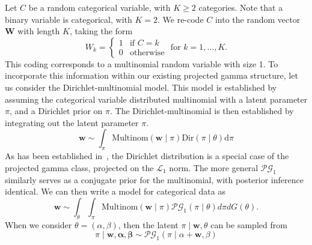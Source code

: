 Let $C$ be a random categorical variable, with $K \geq 2$ categories.  Note 
  that a binary variable is categorical, with $K = 2$. We re-code $C$ into the 
  random vector $\bm{W}$ with length $K$, taking the form
  \[
    W_k = \begin{cases}
    1 &\text{if }C = k\\
    0 &\text{otherwise}
    \end{cases} \text{ for }k = 1,\ldots, K.
  \]
  This coding corresponds to a multinomial random variable with size 1. To 
  incorporate this information within our existing projected gamma structure, 
  let us consider the Dirichlet-multinomial model.  This model is established by
  assuming the categorical variable distributed multinomial with a latent 
  parameter $\pi$, and a Dirichlet prior on $\pi$. The Dirichlet-multinomial is 
  then established by integrating out the latent parameter $\pi$. 
  \[
    \bm{w} \sim \int_{\pi} \text{Multinom}(\bm{w}\mid\pi)\text{Dir}(\pi\mid\theta)\text{d}\pi
  \]
  As has been established in~\cite{trubey:pg}, the Dirichlet distribution is a 
  special case of the projected gamma class, projected on the $\mathcal{L}_1$ 
  norm.  The more general $\mathcal{PG}_1$ similarly serves as a conjugate prior 
  for the multinomial, with posterior inference identical.  We can then write a 
  model for categorical data as
  \begin{equation}
    \label{model:cat}
    \bm{w} \sim \int_{\theta}\int_{\pi}\text{Multinom}(\bm{w}\mid \pi)
                              \mathcal{PG}_1(\pi\mid \theta)d\pi dG(\theta).
  \end{equation}
  When we consider $\theta = (\alpha,\beta)$, then the latent 
  $\pi\mid \bm{w},\theta$ can be sampled from
  \begin{equation}
    \label{eqn:pifc}
    \pi\mid \bm{w},\bm{\alpha},\bm{\beta} \sim \mathcal{PG}_1(\pi\mid\alpha + \bm{w}, \beta)
  \end{equation}


